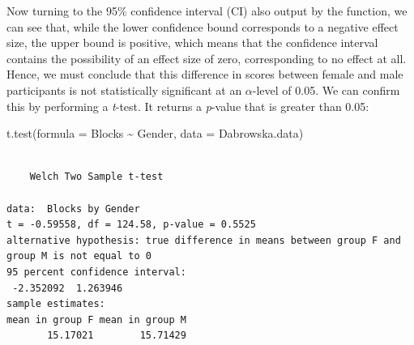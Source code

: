 \documentclass[
  letterpaper,
  DIV=11,
  numbers=noendperiod]{scrreprt}
\newenvironment{Shaded}{\begin{snugshade}}{\end{snugshade}}
\newcommand{\AttributeTok}[1]{\textcolor[rgb]{0.40,0.45,0.13}{#1}}
\newcommand{\FunctionTok}[1]{\textcolor[rgb]{0.28,0.35,0.67}{#1}}
\newcommand{\NormalTok}[1]{\textcolor[rgb]{0.00,0.23,0.31}{#1}}
\newcommand{\SpecialCharTok}[1]{\textcolor[rgb]{0.37,0.37,0.37}{#1}}
\begin{document}
Now turning to the 95\% confidence interval (CI) also output by the
function, we can see that, while the lower confidence bound corresponds
to a negative effect size, the upper bound is positive, which means that
the confidence interval contains the possibility of an effect size of
zero, corresponding to no effect at all. Hence, we must conclude that
this difference in scores between female and male participants is not
statistically significant at an \(\alpha\)-level of 0.05. We can confirm
this by performing a \emph{t}-test. It returns a \emph{p}-value that is
greater than 0.05:

\begin{Shaded}
\begin{Highlighting}[]
\FunctionTok{t.test}\NormalTok{(}\AttributeTok{formula =}\NormalTok{ Blocks }\SpecialCharTok{\textasciitilde{}}\NormalTok{ Gender, }
       \AttributeTok{data =}\NormalTok{ Dabrowska.data)}
\end{Highlighting}
\end{Shaded}

\begin{verbatim}

    Welch Two Sample t-test

data:  Blocks by Gender
t = -0.59558, df = 124.58, p-value = 0.5525
alternative hypothesis: true difference in means between group F and group M is not equal to 0
95 percent confidence interval:
 -2.352092  1.263946
sample estimates:
mean in group F mean in group M 
       15.17021        15.71429 
\end{verbatim}
\end{document}
